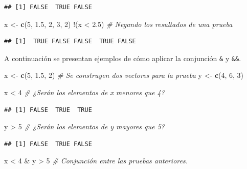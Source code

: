 \documentclass[10pt,]{krantz}
\makeatletter
\newenvironment{Shaded}{\begin{snugshade}}{\end{snugshade}}
\newcommand{\KeywordTok}[1]{\textcolor[rgb]{0.13,0.29,0.53}{\textbf{{#1}}}}
\newcommand{\DecValTok}[1]{\textcolor[rgb]{0.00,0.00,0.81}{{#1}}}
\newcommand{\FloatTok}[1]{\textcolor[rgb]{0.00,0.00,0.81}{{#1}}}
\newcommand{\StringTok}[1]{\textcolor[rgb]{0.31,0.60,0.02}{{#1}}}
\newcommand{\CommentTok}[1]{\textcolor[rgb]{0.56,0.35,0.01}{\textit{{#1}}}}
\newcommand{\NormalTok}[1]{{#1}}
\newenvironment{kframe}{%
\medskip{}
\setlength{\fboxsep}{.8em}
 \def\at@end@of@kframe{}%
 \ifinner\ifhmode%
  \def\at@end@of@kframe{\end{minipage}}%
  \begin{minipage}{\columnwidth}%
 \fi\fi%
 \def\FrameCommand##1{\hskip\@totalleftmargin \hskip-\fboxsep
 \colorbox{shadecolor}{##1}\hskip-\fboxsep
     \hskip-\linewidth \hskip-\@totalleftmargin \hskip\columnwidth}%
 \MakeFramed {\advance\hsize-\width
   \@totalleftmargin\z@ \linewidth\hsize
   \@setminipage}}%
 {\par\unskip\endMakeFramed%
 \at@end@of@kframe}
\renewenvironment{Shaded}{\begin{kframe}}{\end{kframe}}
\makeatother
\begin{document}
\begin{verbatim}
## [1] FALSE  TRUE FALSE
\end{verbatim}

\begin{Shaded}
\begin{Highlighting}[]
\NormalTok{x <-}\StringTok{ }\KeywordTok{c}\NormalTok{(}\DecValTok{5}\NormalTok{, }\FloatTok{1.5}\NormalTok{, }\DecValTok{2}\NormalTok{, }\DecValTok{3}\NormalTok{, }\DecValTok{2}\NormalTok{)}
\NormalTok{!(x <}\StringTok{ }\FloatTok{2.5}\NormalTok{)  }\CommentTok{# Negando los resultados de una prueba}
\end{Highlighting}
\end{Shaded}

\begin{verbatim}
## [1]  TRUE FALSE FALSE  TRUE FALSE
\end{verbatim}

A continuación se presentan ejemplos de cómo aplicar la conjunción
\texttt{\&} y \texttt{\&\&}.

\begin{Shaded}
\begin{Highlighting}[]
\NormalTok{x <-}\StringTok{ }\KeywordTok{c}\NormalTok{(}\DecValTok{5}\NormalTok{, }\FloatTok{1.5}\NormalTok{, }\DecValTok{2}\NormalTok{)  }\CommentTok{# Se construyen dos vectores para la prueba}
\NormalTok{y <-}\StringTok{ }\KeywordTok{c}\NormalTok{(}\DecValTok{4}\NormalTok{, }\DecValTok{6}\NormalTok{, }\DecValTok{3}\NormalTok{)}

\NormalTok{x <}\StringTok{ }\DecValTok{4}  \CommentTok{# ¿Serán los elementos de x menores que 4?}
\end{Highlighting}
\end{Shaded}

\begin{verbatim}
## [1] FALSE  TRUE  TRUE
\end{verbatim}

\begin{Shaded}
\begin{Highlighting}[]
\NormalTok{y >}\StringTok{ }\DecValTok{5}  \CommentTok{# ¿Serán los elementos de y mayores que 5?}
\end{Highlighting}
\end{Shaded}

\begin{verbatim}
## [1] FALSE  TRUE FALSE
\end{verbatim}

\begin{Shaded}
\begin{Highlighting}[]
\NormalTok{x <}\StringTok{ }\DecValTok{4} \NormalTok{&}\StringTok{ }\NormalTok{y >}\StringTok{ }\DecValTok{5}  \CommentTok{# Conjunción entre las pruebas anteriores.}
\end{Highlighting}
\end{Shaded}
\end{document}
